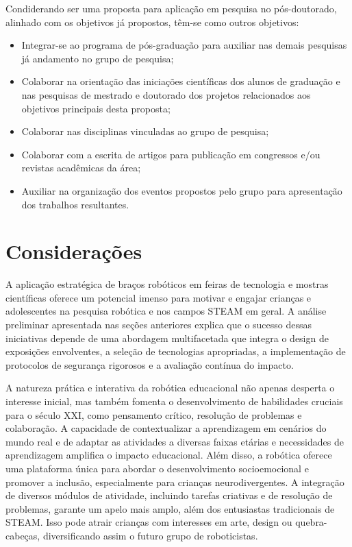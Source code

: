 \documentclass[%
  a4paper,%
  12pt,%
  fleqn,%
  english,%
  brazilian,%
]{article}
\begin{document}
	Condiderando ser uma proposta para aplicação em pesquisa no pós-doutorado, alinhado com os objetivos já propostos, têm-se como outros objetivos:
	\begin{itemize}
		\item Integrar-se ao programa de pós-graduação para auxiliar nas demais pesquisas já andamento no grupo de pesquisa;
		\item Colaborar na orientação das iniciações científicas dos alunos de graduação e nas pesquisas de mestrado e doutorado dos projetos relacionados aos objetivos principais desta proposta;
		\item Colaborar nas disciplinas vinculadas ao grupo de pesquisa;
		\item Colaborar com a escrita de artigos para publicação em congressos e/ou revistas acadêmicas da área;
		\item Auxiliar na organização dos eventos propostos pelo grupo para apresentação dos trabalhos resultantes.
	\end{itemize}





\section{Considerações}
A aplicação estratégica de braços robóticos em feiras de tecnologia e mostras científicas oferece um potencial imenso para motivar e engajar crianças e adolescentes na pesquisa robótica e nos campos STEAM em geral. A análise preliminar apresentada nas seções anteriores explica que o sucesso dessas iniciativas depende de uma abordagem multifacetada que integra o design de exposições envolventes, a seleção de tecnologias apropriadas, a implementação de protocolos de segurança rigorosos e a avaliação contínua do impacto.

A natureza prática e interativa da robótica educacional não apenas desperta o interesse inicial, mas também fomenta o desenvolvimento de habilidades cruciais para o século XXI, como pensamento crítico, resolução de problemas e colaboração. A capacidade de contextualizar a aprendizagem em cenários do mundo real e de adaptar as atividades a diversas faixas etárias e necessidades de aprendizagem amplifica o impacto educacional. Além disso, a robótica oferece uma plataforma única para abordar o desenvolvimento socioemocional e promover a inclusão, especialmente para crianças neurodivergentes. A integração de diversos módulos de atividade, incluindo tarefas criativas e de resolução de problemas, garante um apelo mais amplo, além dos entusiastas tradicionais de STEAM. Isso pode atrair crianças com interesses em arte, design ou quebra-cabeças, diversificando assim o futuro grupo de roboticistas.
\end{document}
